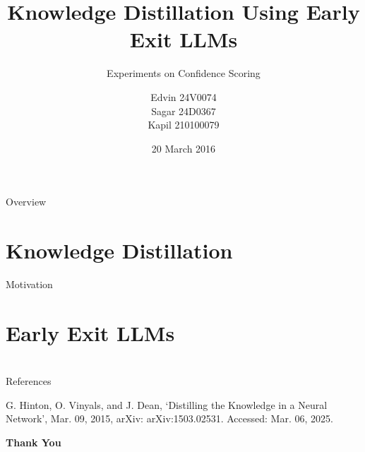 \documentclass[aspectratio=169,xcolor=dvipsnames]{beamer}
\title{Knowledge Distillation Using Early Exit LLMs}
\subtitle{Experiments on Confidence Scoring}
\author{ Edvin 24V0074  \\
Sagar 24D0367 \\
Kapil 210100079 }
\institute
{
    CS 769 \\
    Optimization in Machine Learning %
}
\date{20 March 2016} %
\begin{document}
\begin{frame}
    \titlepage
\end{frame}

\begin{frame}{Overview}
    \tableofcontents
\end{frame}


\section{Knowledge Distillation}
\begin{frame}
    \cite{GH+15} Motivation 
\end{frame}

\section{Early Exit LLMs}

\section{}


\begin{frame}{References}
    \footnotesize
    
    \begin{thebibliography}{4}
        G. Hinton, O. Vinyals, and J. Dean, ‘Distilling the Knowledge in a Neural Network’, 
        Mar. 09, 2015, arXiv: arXiv:1503.02531. Accessed: Mar. 06, 2025. 
    \end{thebibliography}
\end{frame}


\begin{frame}
    \Huge{\centerline{\textbf{Thank You}}}
\end{frame}

\end{document}
